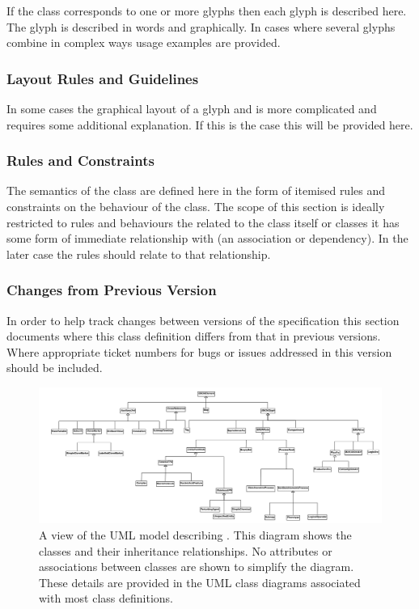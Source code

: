 If the class corresponds to one or more glyphs then each glyph is
described here. The glyph is described in words and graphically. In
cases where several glyphs combine in complex ways usage examples are
provided.

\subsubsection{Layout Rules and Guidelines}

In some cases the graphical layout of a glyph and is more complicated
and requires some additional explanation. If this is the case this
will be provided here.

\subsubsection{Rules and Constraints}

The semantics of the class are defined here in the form of itemised
rules and constraints on the behaviour of the class. The scope of this
section is ideally restricted to rules and behaviours the related to
the class itself or classes it has some form of immediate relationship
with (an association or dependency). In the later case the rules
should relate to that relationship.

\subsubsection{Changes from Previous Version}

In order to help track changes between versions of the specification
this section documents where this class definition differs from
that in previous versions. Where appropriate ticket numbers for bugs
or issues addressed in this version should be included.

\begin{figure}
\includegraphics[width=\textheight]{images/sbgnumloverview}
\caption{A view of the UML model describing \PDl. This diagram shows
  the classes and their inheritance relationships. No attributes or
  associations between classes are shown to simplify the
  diagram. These details are provided in the UML class diagrams
  associated with most class definitions.}
\label{fig:sbgnoverviewuml}
\end{figure}

